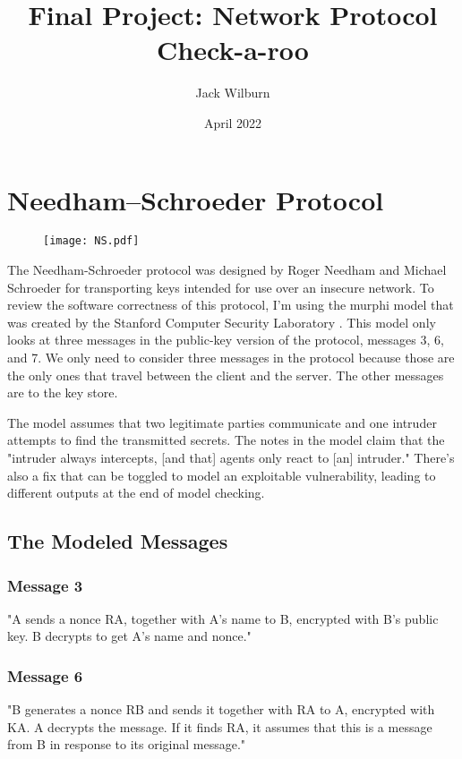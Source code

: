 \documentclass{article}
\title{Final Project: Network Protocol Check-a-roo}
\author{Jack Wilburn}
\date{April 2022}
\begin{document}
\maketitle

\section{Needham–Schroeder Protocol}

\begin{figure}[htbp]
  \centering
  \texttt{[image: NS.pdf]}
\end{figure}

The Needham-Schroeder protocol was designed by Roger Needham and Michael Schroeder for transporting keys intended for use over an insecure network. To review the software correctness of this protocol, I'm using the murphi model that was created by the Stanford Computer Security Laboratory \cite{stern}. This model only looks at three messages in the public-key version of the protocol, messages 3, 6, and 7. We only need to consider three messages in the protocol because those are the only ones that travel between the client and the server. The other messages are to the key store.

The model assumes that two legitimate parties communicate and one intruder attempts to find the transmitted secrets. The notes in the model claim that the "intruder always intercepts, [and that] agents only react to [an] intruder." There's also a fix that can be toggled to model an exploitable vulnerability, leading to different outputs at the end of model checking.

\subsection{The Modeled Messages}

\subsubsection{Message 3}

"A sends a nonce RA, together with A's name to B, encrypted with B's public key. B decrypts to get A's name and nonce."\cite{ns_protocol}

\subsubsection{Message 6}

"B generates a nonce RB and sends it together with RA to A, encrypted with KA. A decrypts the message. If it finds RA, it assumes that this is a message from B in response to its original message."\cite{ns_protocol}
\end{document}
